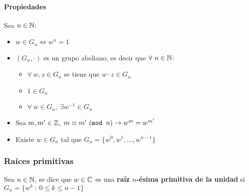\paragraph{Propiedades}
Sea $n\in\mathbb{N}$:
\begin{itemize}
    \item $w\in G_n \iff w^n = 1$
    \item $(G_n,\cdot)$ es un grupo abeliano, es decir que $\forall~n\in\mathbb{N}$:
    \begin{itemize}
        \item $\forall~w,z\in G_n$ se tiene que $w\cdot z\in G_n$
        \item $1\in G_n$
        \item $\forall~w\in G_n,~\exists w^{-1}\in G_n$
    \end{itemize}
    \item Sea $m,m'\in\mathbb{Z}$, $m \equiv m' ~(\texttt{mod } n)\to w^m = w^{m'}$
    \item Existe $w\in G_n$ tal que $G_n = \{w^0, w^1,\dots,w^{n-1}\}$
\end{itemize}

\subsubsection{Raíces primitivas}
Sea $n\in\mathbb{N}$, se dice que $w\in\mathbb{C}$ es una \textbf{raíz $n$-ésima primitiva de la unidad} si \newline $G_n = \{w^k ~:~0\leq k\leq n-1\}$

